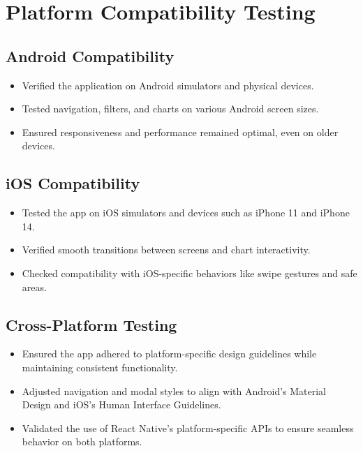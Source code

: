 \documentclass[12pt]{article}
\begin{document}
\bigskip
\section{Platform Compatibility Testing}

\subsection{Android Compatibility}
\begin{itemize}
    \item Verified the application on Android simulators and physical devices.
    \item Tested navigation, filters, and charts on various Android screen sizes.
    \item Ensured responsiveness and performance remained optimal, even on older devices.
\end{itemize}

\subsection{iOS Compatibility}
\begin{itemize}
    \item Tested the app on iOS simulators and devices such as iPhone 11 and iPhone 14.
    \item Verified smooth transitions between screens and chart interactivity.
    \item Checked compatibility with iOS-specific behaviors like swipe gestures and safe areas.
\end{itemize}

\subsection{Cross-Platform Testing}
\begin{itemize}
    \item Ensured the app adhered to platform-specific design guidelines while maintaining consistent functionality.
    \item Adjusted navigation and modal styles to align with Android's Material Design and iOS's Human Interface Guidelines.
    \item Validated the use of React Native's platform-specific APIs to ensure seamless behavior on both platforms.
\end{itemize}
\end{document}
